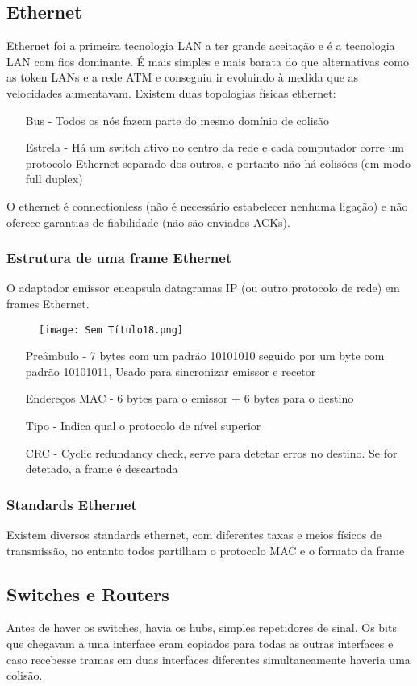 \documentclass[10pt,a4paper]{report}
\begin{document}
\subsection{Ethernet}
Ethernet foi a primeira tecnologia LAN a ter grande aceitação e é a tecnologia LAN com fios dominante. É mais simples e mais barata do que alternativas como as token LANs e a rede ATM e conseguiu ir evoluindo à medida que as velocidades aumentavam. Existem duas topologias físicas ethernet:
\begin{itemize}
\item[Bus] - Todos os nós fazem parte do mesmo domínio de colisão 
\item[Estrela] - Há um switch ativo no centro da rede e cada computador corre um protocolo Ethernet separado dos outros, e portanto não há colisões (em modo full duplex)
\end{itemize}
O ethernet é connectionless (não é necessário estabelecer nenhuma ligação) e não oferece garantias de fiabilidade (não são enviados ACKs).
\subsubsection{Estrutura de uma frame Ethernet}
O adaptador emissor encapsula datagramas IP (ou outro protocolo de rede) em frames Ethernet.
\begin{figure}[H]
\centering
\texttt{[image: Sem Título18.png]}
\end{figure}
\begin{itemize}
\item[Preâmbulo] - 7 bytes com um padrão 10101010 seguido por um byte com padrão 10101011, Usado para sincronizar emissor e recetor
\item[Endereços MAC] - 6 bytes para o emissor + 6 bytes para o destino
\item[Tipo] - Indica qual o protocolo de nível superior
\item[CRC] - Cyclic redundancy check, serve para detetar erros no destino. Se for detetado, a frame é descartada
\end{itemize}
\subsubsection{Standards Ethernet}
Existem diversos standards ethernet, com diferentes taxas e meios físicos de transmissão, no entanto todos partilham o protocolo MAC e o formato da frame
\subsection{Switches e Routers}
Antes de haver os switches, havia os hubs, simples repetidores de sinal. Os bits que chegavam a uma interface eram copiados para todas as outras interfaces e caso recebesse tramas em duas interfaces diferentes simultaneamente haveria uma colisão.
\end{document}
